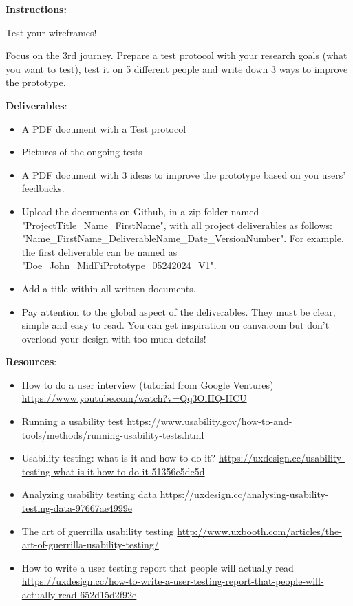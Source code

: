 \makeheaderfiles

\textbf{Instructions:}

Test your wireframes!

Focus on the 3rd journey. Prepare a test protocol with your research goals (what you want to test), test it on 5 different people and write down 3 ways to improve the prototype.

\textbf{Deliverables}:

\begin{itemize}
\item A PDF document with a Test protocol
\item Pictures of the ongoing tests
\item A PDF document with 3 ideas to improve the prototype based on you users' feedbacks.
\item Upload the documents on Github, in a zip folder named "ProjectTitle\_Name\_FirstName", with all project deliverables as follows: "Name\_FirstName\_DeliverableName\_Date\_VersionNumber".  For example, the first deliverable can be named as "Doe\_John\_MidFiPrototype\_05242024\_V1".
\item Add a title within all written documents.
\item Pay attention to the global aspect of the deliverables. They must be clear, simple and easy to read. You can get inspiration on canva.com but don't overload your design with too much details!
\end{itemize}

\textbf{Resources}:

\begin{itemize}
\item How to do a user interview (tutorial from Google Ventures) \url{https://www.youtube.com/watch?v=Qq3OiHQ-HCU}
\item Running a usability test \url{https://www.usability.gov/how-to-and-tools/methods/running-usability-tests.html}
\item Usability testing: what is it and how to do it? \url{https://uxdesign.cc/usability-testing-what-is-it-how-to-do-it-51356e5de5d}
\item Analyzing usability testing data \url{https://uxdesign.cc/analysing-usability-testing-data-97667ae4999e}
\item The art of guerrilla usability testing \url{http://www.uxbooth.com/articles/the-art-of-guerrilla-usability-testing/}
\item How to write a user testing report that people will actually read \url{https://uxdesign.cc/how-to-write-a-user-testing-report-that-people-will-actually-read-652d15d2f92e}
\end{itemize}

